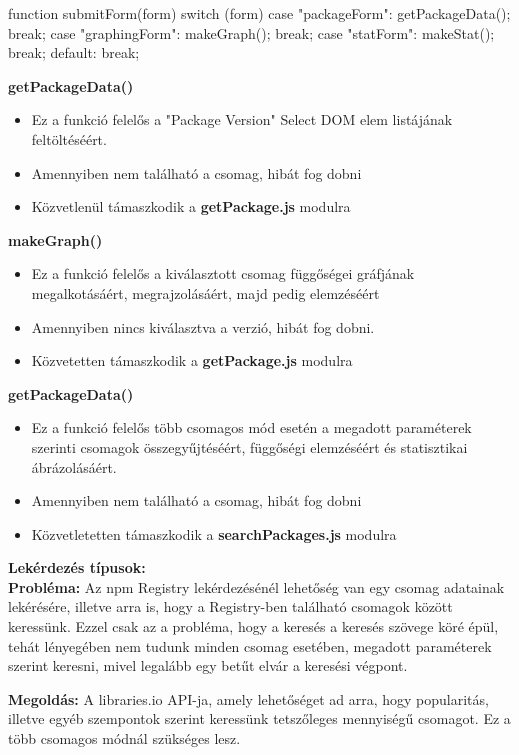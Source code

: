 \begin{cpp}
function submitForm(form){
	switch (form) {
		case "packageForm":
		getPackageData();
		break;
		case "graphingForm":
		makeGraph();
		break;
		case "statForm":
		makeStat();
		break;
		default:
		break;
	}
}
\end{cpp}

\noindent\textbf{getPackageData()}
\begin{itemize}
	\item Ez a funkció felelős a "Package Version" Select DOM elem listájának feltöltéséért. 
	\item Amennyiben nem található a csomag, hibát fog dobni
	\item Közvetlenül támaszkodik a \textbf{getPackage.js} modulra
\end{itemize}

\noindent\textbf{makeGraph()}
\begin{itemize}
	\item Ez a funkció felelős a kiválasztott csomag függőségei gráfjának megalkotásáért, megrajzolásáért, majd pedig elemzéséért
	\item Amennyiben nincs kiválasztva a verzió, hibát fog dobni.
	\item Közvetetten támaszkodik a \textbf{getPackage.js} modulra
\end{itemize}

\noindent\textbf{getPackageData()}
\begin{itemize}
	\item Ez a funkció felelős több csomagos mód esetén a megadott paraméterek szerinti csomagok összegyűjtéséért, függőségi elemzéséért és statisztikai ábrázolásáért.
	\item Amennyiben nem található a csomag, hibát fog dobni
	\item Közvetletetten támaszkodik a \textbf{searchPackages.js} modulra
\end{itemize}

\noindent\textbf{Lekérdezés típusok:}\\

\textbf{Probléma:} Az npm Registry lekérdezésénél lehetőség van egy csomag adatainak lekérésére, illetve arra is, hogy a Registry-ben található csomagok között keressünk. Ezzel csak az a probléma, hogy a keresés a keresés szövege köré épül, tehát lényegében nem tudunk minden csomag esetében, megadott paraméterek szerint keresni, mivel legalább egy betűt elvár a keresési végpont.

\textbf{Megoldás:} A libraries.io API-ja, amely lehetőséget ad arra, hogy popularitás, illetve egyéb szempontok szerint keressünk tetszőleges mennyiségű csomagot. Ez a több csomagos módnál szükséges lesz.

